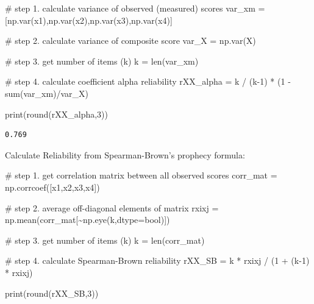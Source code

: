 \documentclass[
  letterpaper,
  DIV=11,
  numbers=noendperiod]{scrreprt}
\newenvironment{Shaded}{\begin{snugshade}}{\end{snugshade}}
\newcommand{\BuiltInTok}[1]{\textcolor[rgb]{0.00,0.23,0.31}{#1}}
\newcommand{\CommentTok}[1]{\textcolor[rgb]{0.37,0.37,0.37}{#1}}
\newcommand{\DecValTok}[1]{\textcolor[rgb]{0.68,0.00,0.00}{#1}}
\newcommand{\NormalTok}[1]{\textcolor[rgb]{0.00,0.23,0.31}{#1}}
\newcommand{\OperatorTok}[1]{\textcolor[rgb]{0.37,0.37,0.37}{#1}}
\begin{document}
\begin{Shaded}
\begin{Highlighting}[]
\CommentTok{\# step 1. calculate variance of observed (measured) scores}
\NormalTok{var\_xm }\OperatorTok{=}\NormalTok{ [np.var(x1),np.var(x2),np.var(x3),np.var(x4)]}

\CommentTok{\# step 2. calculate variance of composite score}
\NormalTok{var\_X }\OperatorTok{=}\NormalTok{ np.var(X)}

\CommentTok{\# step 3. get number of items (k)}
\NormalTok{k }\OperatorTok{=} \BuiltInTok{len}\NormalTok{(var\_xm)}

\CommentTok{\# step 4. calculate coefficient alpha reliability}
\NormalTok{rXX\_alpha }\OperatorTok{=}\NormalTok{ k }\OperatorTok{/}\NormalTok{ (k}\OperatorTok{{-}}\DecValTok{1}\NormalTok{) }\OperatorTok{*}\NormalTok{ (}\DecValTok{1} \OperatorTok{{-}} \BuiltInTok{sum}\NormalTok{(var\_xm)}\OperatorTok{/}\NormalTok{var\_X)}

\BuiltInTok{print}\NormalTok{(}\BuiltInTok{round}\NormalTok{(rXX\_alpha,}\DecValTok{3}\NormalTok{)) }
\end{Highlighting}
\end{Shaded}

\begin{verbatim}
0.769
\end{verbatim}

Calculate Reliability from Spearman-Brown's prophecy formula:

\begin{Shaded}
\begin{Highlighting}[]
\CommentTok{\# step 1. get correlation matrix between all observed scores}
\NormalTok{corr\_mat }\OperatorTok{=}\NormalTok{ np.corrcoef([x1,x2,x3,x4])}

\CommentTok{\# step 2. average off{-}diagonal elements of matrix}
\NormalTok{rxixj }\OperatorTok{=}\NormalTok{ np.mean(corr\_mat[}\OperatorTok{\textasciitilde{}}\NormalTok{np.eye(k,dtype}\OperatorTok{=}\BuiltInTok{bool}\NormalTok{)])}

\CommentTok{\# step 3. get number of items (k)}
\NormalTok{k }\OperatorTok{=} \BuiltInTok{len}\NormalTok{(corr\_mat)}

\CommentTok{\# step 4. calculate Spearman{-}Brown reliability}
\NormalTok{rXX\_SB }\OperatorTok{=}\NormalTok{ k }\OperatorTok{*}\NormalTok{ rxixj }\OperatorTok{/}\NormalTok{ (}\DecValTok{1} \OperatorTok{+}\NormalTok{ (k}\OperatorTok{{-}}\DecValTok{1}\NormalTok{) }\OperatorTok{*}\NormalTok{ rxixj)}

\BuiltInTok{print}\NormalTok{(}\BuiltInTok{round}\NormalTok{(rXX\_SB,}\DecValTok{3}\NormalTok{)) }
\end{Highlighting}
\end{Shaded}
\end{document}
